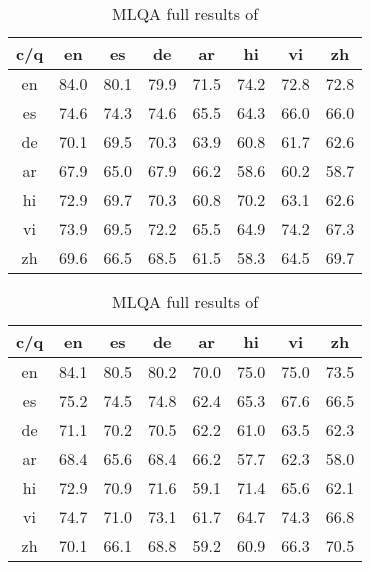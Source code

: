 \documentclass[11pt]{article}
\begin{document}
\begin{table}[h!]
  \small
  \center
  \begin{minipage}[t]{.45\textwidth}
    \begin{center}
      \begin{tabular}{cccccccc} \toprule
    c/q & en & es & de & ar & hi & vi & zh \\ \midrule
    en & 84.0 & 80.1 & 79.9 & 71.5 & 74.2 & 72.8 & 72.8 \\
    es & 74.6 & 74.3 & 74.6 & 65.5 & 64.3 & 66.0 & 66.0 \\
    de & 70.1 & 69.5 & 70.3 & 63.9 & 60.8 & 61.7 & 62.6 \\
    ar & 67.9 & 65.0 & 67.9 & 66.2 & 58.6 & 60.2 & 58.7 \\
    hi & 72.9 & 69.7 & 70.3 & 60.8 & 70.2 & 63.1 & 62.6 \\
    vi & 73.9 & 69.5 & 72.2 & 65.5 & 64.9 & 74.2 & 67.3 \\
    zh & 69.6 & 66.5 & 68.5 & 61.5 & 58.3 & 64.5 & 69.7 \\
    \bottomrule
      \end{tabular}
    \end{center}
    \caption{MLQA full results of \mlukeW{}\la{}}
    \label{table:mlqa-mlukeW-large}
  \end{minipage}
\hspace{5mm}
\begin{minipage}[t]{.45\textwidth}
    \begin{center}
      \begin{tabular}{cccccccc} \toprule
    c/q & en & es & de & ar & hi & vi & zh \\ \midrule
    en & 84.1 & 80.5 & 80.2 & 70.0 & 75.0 & 75.0 & 73.5 \\
    es & 75.2 & 74.5 & 74.8 & 62.4 & 65.3 & 67.6 & 66.5 \\
    de & 71.1 & 70.2 & 70.5 & 62.2 & 61.0 & 63.5 & 62.3 \\
    ar & 68.4 & 65.6 & 68.4 & 66.2 & 57.7 & 62.3 & 58.0 \\
    hi & 72.9 & 70.9 & 71.6 & 59.1 & 71.4 & 65.6 & 62.1 \\
    vi & 74.7 & 71.0 & 73.1 & 61.7 & 64.7 & 74.3 & 66.8 \\
    zh & 70.1 & 66.1 & 68.8 & 59.2 & 60.9 & 66.3 & 70.5 \\
    \bottomrule
      \end{tabular}
    \end{center}
    \caption{MLQA full results of \mlukeE{}\la{}}
    \label{table:mlqa-mlukeE-large}
  \end{minipage}
\end{table}
\end{document}
